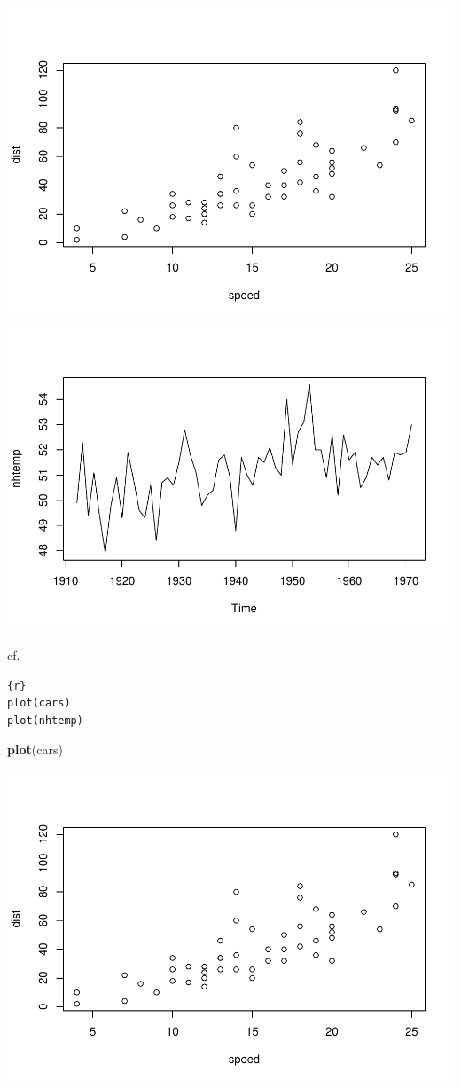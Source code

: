 \documentclass[
]{book}
\newenvironment{Shaded}{\begin{snugshade}}{\end{snugshade}}
\newcommand{\FunctionTok}[1]{\textcolor[rgb]{0.13,0.29,0.53}{\textbf{#1}}}
\newcommand{\NormalTok}[1]{#1}
\theoremstyle{definition}
\theoremstyle{definition}
\theoremstyle{definition}
\theoremstyle{definition}
\theoremstyle{remark}
\begin{document}
\includegraphics[width=0.5\linewidth]{202401280001-test_files/figure-latex/unnamed-chunk-4-1} \includegraphics[width=0.5\linewidth]{202401280001-test_files/figure-latex/unnamed-chunk-4-2}

cf.

\begin{verbatim}
{r}
plot(cars)
plot(nhtemp)
\end{verbatim}

\begin{Shaded}
\begin{Highlighting}[]
\FunctionTok{plot}\NormalTok{(cars)}
\end{Highlighting}
\end{Shaded}

\includegraphics{202401280001-test_files/figure-latex/unnamed-chunk-5-1.pdf}
\end{document}
